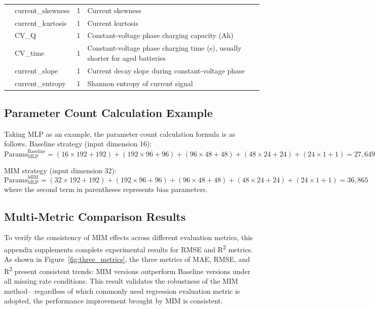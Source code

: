 \documentclass[10pt,a4paper]{article}
\begin{document}
\begin{table}[H]
\begin{tabular}{@{}llcp{6cm}@{}}
& current\_skewness & 1 & Current skewness \\
& current\_kurtosis & 1 & Current kurtosis \\
& CV\_Q & 1 & Constant-voltage phase charging capacity (Ah) \\
& CV\_time & 1 & Constant-voltage phase charging time (s), usually shorter for aged batteries \\
& current\_slope & 1 & Current decay slope during constant-voltage phase \\
& current\_entropy & 1 & Shannon entropy of current signal \\
\bottomrule
\end{tabular}
\end{table}

\subsection{Parameter Count Calculation Example}

Taking MLP as an example, the parameter count calculation formula is as follows. Baseline strategy (input dimension 16):
\begin{equation}
    \text{Params}_{\text{MLP}}^{\text{Baseline}} = (16 \times 192 + 192) + (192 \times 96 + 96) + (96 \times 48 + 48) + (48 \times 24 + 24) + (24 \times 1 + 1) = 27,649
\end{equation}

MIM strategy (input dimension 32):
\begin{equation}
    \text{Params}_{\text{MLP}}^{\text{MIM}} = (32 \times 192 + 192) + (192 \times 96 + 96) + (96 \times 48 + 48) + (48 \times 24 + 24) + (24 \times 1 + 1) = 36,865
\end{equation}
where the second term in parentheses represents bias parameters.

\subsection{Multi-Metric Comparison Results}

To verify the consistency of MIM effects across different evaluation metrics, this appendix supplements complete experimental results for RMSE and R\textsuperscript{2} metrics. As shown in Figure~\ref{fig:three_metrics}, the three metrics of MAE, RMSE, and R\textsuperscript{2} present consistent trends: MIM versions outperform Baseline versions under all missing rate conditions. This result validates the robustness of the MIM method---regardless of which commonly used regression evaluation metric is adopted, the performance improvement brought by MIM is consistent.
\end{document}
